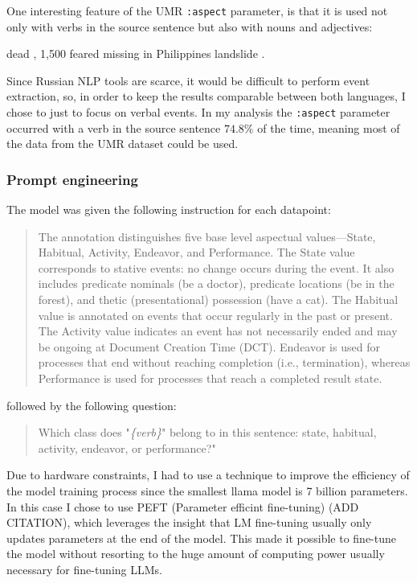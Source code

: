 One interesting feature of the UMR \texttt{:aspect} parameter, is that it is used not only with verbs in the source sentence but also with nouns and adjectives:

\begin{exe}
     dead , 1,500 feared missing in Philippines landslide .
\end{exe}

Since Russian NLP tools are scarce, it would be difficult to perform event extraction, so, in order to keep the results comparable between both languages, I chose to just to focus on verbal events. In my analysis the \texttt{:aspect} parameter occurred with a verb in the source sentence $74.8\%$ of the time, meaning most of the data from the UMR dataset could be used.

\subsubsection*{Prompt engineering}
The model was given the following instruction for each datapoint:
\begin{quotation}
    The annotation distinguishes five base level aspectual values—State, Habitual, Activity, Endeavor, and Performance. The State value corresponds to stative events: no change occurs during the event. It also includes predicate nominals (be a doctor), predicate locations (be in the forest), and thetic (presentational) possession (have a cat). The Habitual value is annotated on events that occur regularly in the past or present. The Activity value indicates an event has not necessarily ended and may be ongoing at Document Creation Time (DCT). Endeavor is used for processes that end without reaching completion (i.e., termination), whereas Performance is used for processes that reach a completed result state. 
\end{quotation}
followed by the following question:
\begin{quotation}
    Which class does "\emph{\{verb\}}" belong to in this sentence: state, habitual, activity, endeavor, or performance?"
\end{quotation}

Due to hardware constraints, I had to use a technique to improve the efficiency of the model training process since the smallest llama model is 7 billion parameters. In this case I chose to use PEFT (Parameter efficint fine-tuning) (ADD CITATION), which leverages the insight that LM fine-tuning usually only updates parameters at the end of the model. This made it possible to fine-tune the model without resorting to the huge amount of computing power usually necessary for fine-tuning LLMs.

